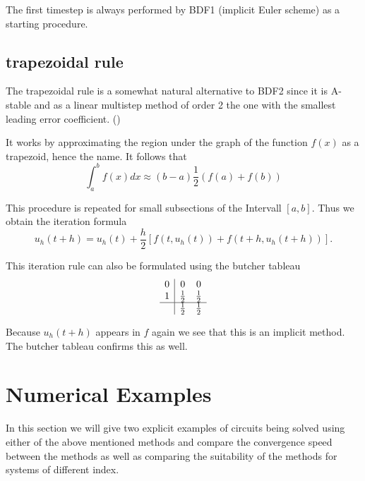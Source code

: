	The first timestep is always performed by BDF1 (implicit Euler scheme) as a starting procedure.
	
	
\subsection{trapezoidal rule}

	The trapezoidal rule is a somewhat natural alternative to BDF2 since it is A-stable and as a linear multistep method of order 2 the one with the smallest leading error coefficient. (\cite{ModellingAndDiscretizationOfCircuitProblems})
	
	It works by approximating the region under the graph of the function $f(x)$ as a trapezoid, hence the name. It follows that	
	\begin{displaymath}
		\int_{a}^{b} f(x) dx \approx (b-a)\frac{1}{2} (f(a)+f(b))
	\end{displaymath}
	
	This procedure is repeated for small subsections of the Intervall $[a,b]$. Thus we obtain the iteration formula
	\begin{displaymath}
		u_h (t+h) = u_h(t) +\frac{h}{2}[f(t,u_h(t)) + f(t+h, u_h(t+h))].
	\end{displaymath}
	
	This iteration rule can also be formulated using the butcher tableau	
	\begin{displaymath}
		\begin{array}{c|cc}
			0 & 0 & 0 \\
			1 & \frac{1}{2} & \frac{1}{2} \\
			\hline
			& \frac{1}{2} & \frac{1}{2}
		\end{array}
	\end{displaymath}
	
	Because $u_h(t+h)$ appears in $f$ again we see that this is an implicit method. The butcher tableau confirms this as well.
	
\section{Numerical Examples}
	
	In this section we will give two explicit examples of circuits being solved using either of the above mentioned methods and compare the convergence speed between the methods as well as comparing the suitability of the methods for systems of different index.
	


		
		
	
	
	